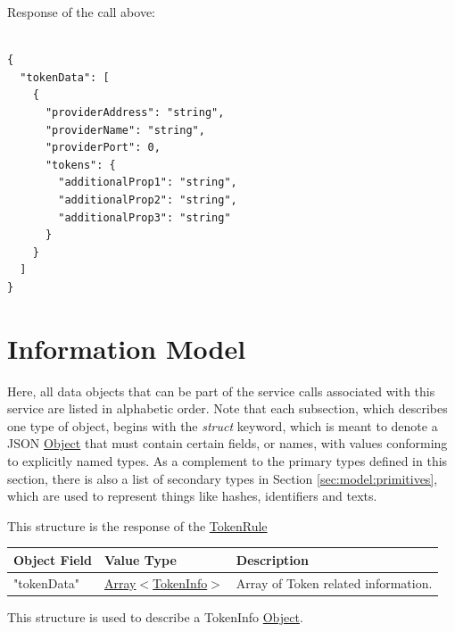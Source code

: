 \documentclass[a4paper]{arrowhead}
\newcommand{\fref}[1]{{\textcolor{ArrowheadBlue}{\hyperref[sec:functions:#1]{#1}}}}
\newcommand{\mref}[1]{{\textcolor{ArrowheadPurple}{\hyperref[sec:model:#1]{#1}}}}
\newcommand{\pref}[1]{{\textcolor{ArrowheadGrey}{\hyperref[sec:model:primitives:#1]{#1}}}}
\begin{document}
Response of the call above:

\begin{lstlisting}[language=http,label={lst:token_response},caption={A \fref{Check an InterCloud Rule} InterCloudRresponse}]

{
  "tokenData": [
    {
      "providerAddress": "string",
      "providerName": "string",
      "providerPort": 0,
      "tokens": {
        "additionalProp1": "string",
        "additionalProp2": "string",
        "additionalProp3": "string"
      }
    }
  ]
}

\end{lstlisting}

\newpage

\section{Information Model}
\label{sec:model}

Here, all data objects that can be part of the service calls associated with this service are listed in alphabetic order.
Note that each subsection, which describes one type of object, begins with the \textit{struct} keyword, which is meant to denote a JSON \pref{Object} that must contain certain fields, or names, with values conforming to explicitly named types.
As a complement to the primary types defined in this section, there is also a list of secondary types in Section \ref{sec:model:primitives}, which are used to represent things like hashes, identifiers and texts.


This structure is the response of the \pref{TokenRule}

\begin{table}[ht!]
\begin{tabularx}{\textwidth}{| p{5cm} | p{3.5cm} | X |} \hline
\rowcolor{gray!33} Object Field & Value Type      & Description \\ \hline
"tokenData"  & \pref{Array}$<$\mref{TokenInfo}$>$     & Array of Token related information. \\ \hline

\end{tabularx}
\end{table}


This structure is used to describe a TokenInfo \pref{Object}.
\end{document}
